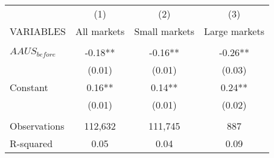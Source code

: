 \begin{tabular}{lccc} \hline
 & (1) & (2) & (3) \\
VARIABLES & All markets & Small markets & Large markets \\ \hline
 &  &  &  \\
$ AAUS_{before} $ & -0.18** & -0.16** & -0.26** \\
 & (0.01) & (0.01) & (0.03) \\
Constant & 0.16** & 0.14** & 0.24** \\
 & (0.01) & (0.01) & (0.02) \\
 &  &  &  \\
Observations & 112,632 & 111,745 & 887 \\
 R-squared & 0.05 & 0.04 & 0.09 \\ \hline
\end{tabular}
